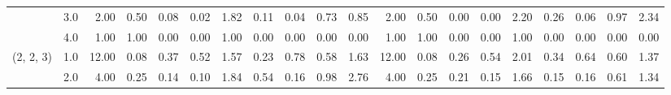 \begin{tabular}{llrrrrrrrrrrrrrrrrrr}
          & 3.0 &               2.00 &                     0.50 &                                 0.08 &                             0.02 &                           1.82 &                                               0.11 &                                            0.04 &                                            0.73 &                                        0.85 &               2.00 &                     0.50 &                                 0.00 &                             0.00 &                           2.20 &                                               0.26 &                                            0.06 &                                            0.97 &                                        2.34 \\
          & 4.0 &               1.00 &                     1.00 &                                 0.00 &                             0.00 &                           1.00 &                                               0.00 &                                            0.00 &                                            0.00 &                                        0.00 &               1.00 &                     1.00 &                                 0.00 &                             0.00 &                           1.00 &                                               0.00 &                                            0.00 &                                            0.00 &                                        0.00 \\
(2, 2, 3) & 1.0 &              12.00 &                     0.08 &                                 0.37 &                             0.52 &                           1.57 &                                               0.23 &                                            0.78 &                                            0.58 &                                        1.63 &              12.00 &                     0.08 &                                 0.26 &                             0.54 &                           2.01 &                                               0.34 &                                            0.64 &                                            0.60 &                                        1.37 \\
          & 2.0 &               4.00 &                     0.25 &                                 0.14 &                             0.10 &                           1.84 &                                               0.54 &                                            0.16 &                                            0.98 &                                        2.76 &               4.00 &                     0.25 &                                 0.21 &                             0.15 &                           1.66 &                                               0.15 &                                            0.16 &                                            0.61 &                                        1.34 \\

\end{tabular}
